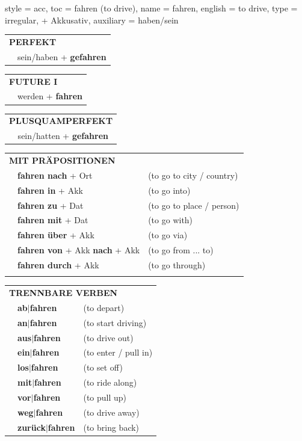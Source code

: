 \begin{verbentry}{
  style = {acc},
  toc = {fahren (to drive)},
  name = {fahren},
  english = {to drive},
  type = {irregular, + Akkusativ},
  auxiliary = {haben/sein}
}
 \begin{tabular}{rl}
     \multicolumn{2}{l}{\textbf{PERFEKT}}\\
  &  sein/haben + \textbf{gefahren}\\
  \end{tabular}
\hfill
   \begin{tabular}{rl}
   
    \multicolumn{2}{l}{\textbf{FUTURE I} }\\
  &  werden + \textbf{fahren}\\
 
  \end{tabular}
\hfill
   \begin{tabular}{rl}
      \multicolumn{2}{l}{\textbf{PLUSQUAMPERFEKT}}\\
   & sein/hatten + \textbf{gefahren}\\
  \end{tabular}
  
\vspace{10pt}

   \begin{tabular}{lll}
      \multicolumn{3}{l}{\textbf{MIT PRÄPOSITIONEN}}\\
& \textbf{fahren nach} + Ort & (to go to city / country)\\
&\textbf{fahren in} + Akk & (to go into)\\
&\textbf{fahren zu} + Dat & (to go to place / person)\\
&\textbf{fahren mit} + Dat & (to go with)\\
&\textbf{fahren über} + Akk & (to go via)\\
&\textbf{fahren von} + Akk  \textbf{nach} + Akk & (to go from ... to)\\
&\textbf{fahren durch} + Akk & (to go through)\\
\vspace{20pt}
  \end{tabular}
  \hfill
   \begin{tabular}{lll}
      \multicolumn{3}{l}{\textbf{TRENNBARE VERBEN}}\\
 & \textbf{ab$|$fahren} & (to depart)\\
 & \textbf{an$|$fahren} & (to start driving)\\
  & \textbf{aus$|$fahren} & (to drive out)\\
  & \textbf{ein$|$fahren} & (to enter / pull in)\\
  & \textbf{los$|$fahren} & (to set off)\\
     & \textbf{mit$|$fahren} & (to ride along)\\
     & \textbf{vor$|$fahren} & (to pull up)\\
     & \textbf{weg$|$fahren} & (to drive away)\\
      & \textbf{zurück$|$fahren} & (to bring back)\\
  \end{tabular}


  \vspace{-5pt}
\end{verbentry}

